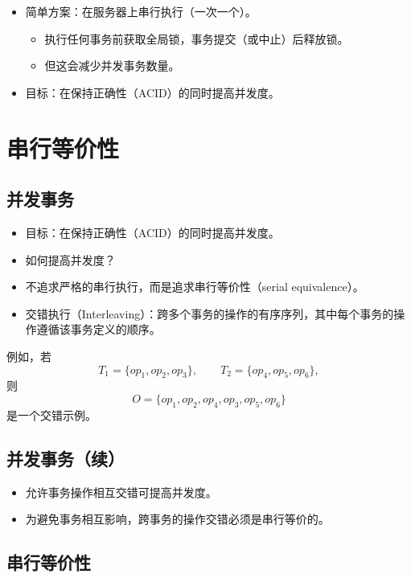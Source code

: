 \documentclass[UTF8,a4paper,11pt]{ctexart}
\begin{document}
\begin{itemize}
  \item 简单方案：在服务器上串行执行（一次一个）。
  \begin{itemize}
    \item 执行任何事务前获取全局锁，事务提交（或中止）后释放锁。
    \item 但这会减少并发事务数量。
  \end{itemize}
  \item 目标：在保持正确性（ACID）的同时提高并发度。
\end{itemize}

\section{串行等价性}

\subsection{并发事务}

\begin{itemize}
  \item 目标：在保持正确性（ACID）的同时提高并发度。
  \item 如何提高并发度？
  \item 不追求严格的串行执行，而是追求串行等价性（serial equivalence）。
  \item 交错执行（Interleaving）：跨多个事务的操作的有序序列，其中每个事务的操作遵循该事务定义的顺序。
\end{itemize}

例如，若
\[
T_1=\{\mathit{op}_1,\mathit{op}_2,\mathit{op}_3\}, \qquad
T_2=\{\mathit{op}_4,\mathit{op}_5,\mathit{op}_6\},
\]
则
\[
O=\{\mathit{op}_1,\mathit{op}_2,\mathit{op}_4,\mathit{op}_3,\mathit{op}_5,\mathit{op}_6\}
\]
是一个交错示例。

\subsection{并发事务（续）}

\begin{itemize}
  \item 允许事务操作相互交错可提高并发度。
  \item 为避免事务相互影响，跨事务的操作交错必须是串行等价的。
\end{itemize}

\subsection{串行等价性}
\end{document}
